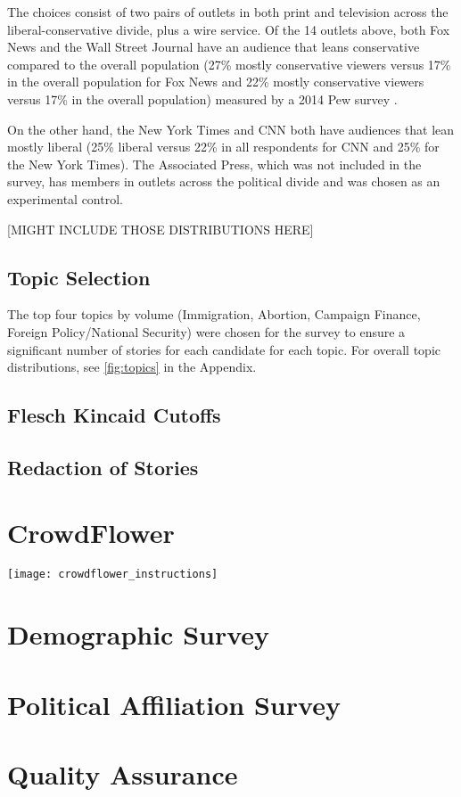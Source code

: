 The choices consist of two pairs of outlets in both print and television across the liberal-conservative divide, plus a wire service. Of the 14 outlets above, both Fox News and the Wall Street Journal have an audience that leans conservative compared to the overall population (27\% mostly conservative viewers versus 17\% in the overall population for Fox News and 22\% mostly conservative viewers versus 17\% in the overall population) measured by a 2014 Pew survey \cite{PoliticalPolarization}.

On the other hand, the New York Times and CNN both have audiences that lean mostly liberal (25\% liberal versus 22\% in all respondents for CNN and 25\% for the New York Times). The Associated Press, which was not included in the survey, has members in outlets across the political divide and was chosen as an experimental control. 

[MIGHT INCLUDE THOSE DISTRIBUTIONS HERE]

\subsection {Topic Selection}

The top four topics by volume (Immigration, Abortion, Campaign Finance, Foreign Policy/National Security) were chosen for the survey to ensure a significant number of stories for each candidate for each topic. For overall topic distributions, see \ref{fig:topics} in the Appendix.
 




\subsection {Flesch Kincaid Cutoffs}
\subsection {Redaction of Stories}

 

\section{CrowdFlower}

\texttt{[image: crowdflower\_instructions]}
 
\section{Demographic Survey}
\section{Political Affiliation Survey}
\section{Quality Assurance}
